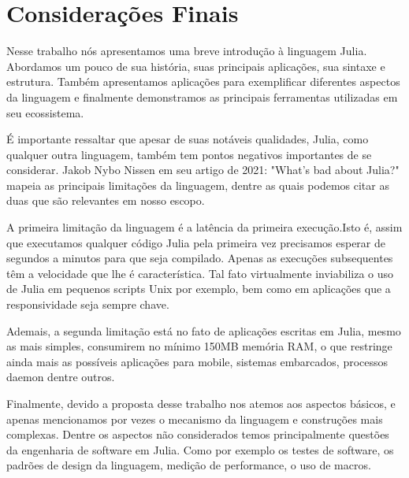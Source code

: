 %



\chapter{Considerações Finais}

Nesse trabalho nós apresentamos uma breve introdução à linguagem Julia. Abordamos um pouco de sua história, suas principais aplicações, sua sintaxe e estrutura. Também apresentamos aplicações para exemplificar diferentes aspectos da linguagem e finalmente demonstramos as principais ferramentas utilizadas em seu ecossistema. 

É importante ressaltar que apesar de suas notáveis qualidades, Julia, como qualquer outra linguagem, também tem pontos negativos importantes de se considerar. Jakob Nybo Nissen em seu artigo de 2021: "What's bad about Julia?"\cite{Nissen2021} mapeia as principais limitações da linguagem, dentre as quais podemos citar as duas que são relevantes em nosso escopo.

A primeira limitação da linguagem é a latência da primeira execução.Isto é, assim que executamos qualquer código Julia pela primeira vez precisamos esperar de segundos a minutos para que seja compilado. Apenas as execuções subsequentes têm a velocidade que lhe é característica. Tal fato virtualmente inviabiliza o uso de Julia em pequenos scripts Unix por exemplo, bem como em aplicações que a responsividade seja sempre chave.

Ademais, a segunda limitação está no fato de aplicações escritas em Julia, mesmo as mais simples, consumirem no mínimo 150MB memória RAM, o que restringe ainda mais as possíveis aplicações para mobile, sistemas embarcados, processos daemon dentre outros.  

Finalmente, devido a proposta desse trabalho nos atemos aos aspectos básicos, e apenas mencionamos por vezes o mecanismo da linguagem e construções mais complexas. 
Dentre os aspectos não considerados temos principalmente questões da engenharia de software em Julia. Como por exemplo os testes de software, os padrões de design da linguagem, medição de performance, o uso de macros. 


